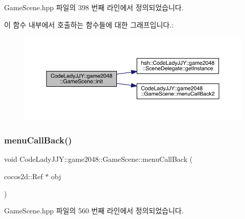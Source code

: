 Game\+Scene.\+hpp 파일의 398 번째 라인에서 정의되었습니다.

이 함수 내부에서 호출하는 함수들에 대한 그래프입니다.\+:
\nopagebreak
\begin{figure}[H]
\begin{center}
\leavevmode
\includegraphics[width=350pt]{class_code_lady_j_j_y_1_1game2048_1_1_game_scene_ab0ccbc102ba9ceca94daddc2e8f253ba_cgraph}
\end{center}
\end{figure}
\mbox{\label{class_code_lady_j_j_y_1_1game2048_1_1_game_scene_ac748b7487b72bc4722b7bbdb181e7267}} 
\subsubsection{\texorpdfstring{menu\+Call\+Back()}{menuCallBack()}}
{\footnotesize\ttfamily void Code\+Lady\+J\+J\+Y\+::game2048\+::\+Game\+Scene\+::menu\+Call\+Back (\begin{DoxyParamCaption}\item[{cocos2d\+::\+Ref $\ast$}]{obj }\end{DoxyParamCaption})\hspace{0.3cm}{\ttfamily [inline]}}



Game\+Scene.\+hpp 파일의 560 번째 라인에서 정의되었습니다.

